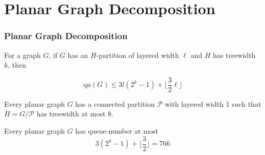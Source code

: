 \documentclass{beamer}
\begin{document}
	\section{Planar Graph Decomposition}
	\begin{frame}
		\frametitle{Planar Graph Decomposition}
		{
			\begin{theorem}
				For a graph $G$, if $G$ has an $H$-partition of layered width $\ell$ and $H$ has treewidth $k$, then 
				
				$$\text{qn}(G) \le 3l(2^k-1) + \lfloor \frac{3}{2} \ell \rfloor$$
			\end{theorem}
		}
		\vfill
		{
			\begin{theorem}
				Every planar graph $G$ has a connected partition $\mathcal{P}$ with layered width 1 such that $H = G/\mathcal{P}$ has treewidth at most 8.
			\end{theorem}
		}
		\vfill
		{
			\begin{theorem}
				Every planar graph $G$ has queue-number at most 
				$$3(2^8-1) + \lfloor \frac{3}{2} \rfloor = 766$$ 
			\end{theorem}
		}
	\end{frame}
\end{document}
